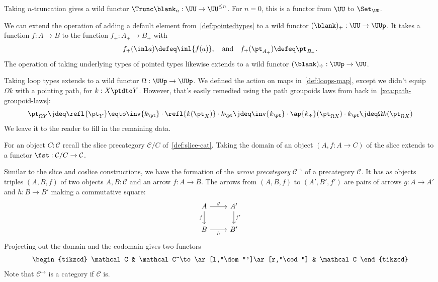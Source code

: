 \begin{example}
  Taking $n$-truncation gives a wild functor
  $\Trunc\blank_n : \UU \to \UU^{\le n}$.
  For $n=0$, this is a functor from $\UU$ to $\Set_\UU$.
\end{example}
\begin{example}\label{ex:add-remove-basepoint}
  We can extend the operation of adding a default element
  from~\cref{def:pointedtypes}
  to a wild functor $(\blank)_+ : \UU \to \UUp$.
  It takes a function $f : A \to B$
  to the function $f_+ : A_+ \to B_+$
  with
  \[
    f_+(\inl a) \defeq \inl{f(a)},\quad\text{and}\quad
    f_+(\pt_{A_+}) \defeq \pt_{B_+}.
  \]
  The operation of taking underlying types of pointed types
  likewise extends to a wild functor $(\blank)_\div : \UUp \to \UU$.
\end{example}
\begin{example}
  Taking loop types extends to a wild functor $\Omega : \UUp \to \UUp$.
  We defined the action on maps in~\cref{def:loops-map},
  except we didn't equip $\Omega k$ with a pointing path, for $k : X \ptdto Y$.
  However, that's easily remedied using the path groupoids
  laws from back in~\cref{xca:path-groupoid-laws}:
  \[
    \pt_{\Omega Y} \jdeq \refl{\pt_Y}
    \eqto \inv{k_\pt} \cdot \refl{k(\pt_X)} \cdot k_\pt
    \jdeq \inv{k_\pt} \cdot \ap{k_\div}(\pt_{\Omega X}) \cdot k_\pt
    \jdeq \Omega k(\pt_{\Omega X})
  \]
  We leave it to the reader to fill in the remaining data.
\end{example}
\begin{example}
  For an object $C : \mathcal C$ recall the slice precategory
  $\mathcal C/C$ of~\cref{def:slice-cat}.
  Taking the domain of an object $(A,f:A\to C)$ of the slice
  extends to a functor $\fst : \mathcal C/C \to \mathcal C$.
\end{example}
\begin{example}
  Similar to the slice and coslice constructions,
  we have the formation of the \emph{arrow precategory} $\mathcal C^\to$
  of a precategory $\mathcal C$.
  It has as objects triples $(A,B,f)$ of two objects $A,B:\mathcal C$
  and an arrow $f: A\to B$.
  The arrows from $(A,B,f)$ to $(A',B',f')$ are pairs of arrows
  $g : A \to A'$ and $h : B\to B'$ making a commutative square:
  \[
    \begin{tikzcd}
      A \ar[d,"f"']\ar[r,"g"] & A'\ar[d,"f'"] \\
      B \ar[r,"h"'] & B'
    \end{tikzcd}
  \]
  Projecting out the domain and the codomain gives
  two functors
  \[
    \begin{tikzcd}
      \mathcal C & \mathcal C^\to \ar[l,"\dom"']\ar[r,"\cod"] & \mathcal C
    \end{tikzcd}
  \]
  Note that $\mathcal C^\to$ is a category if $\mathcal C$ is.
\end{example}
